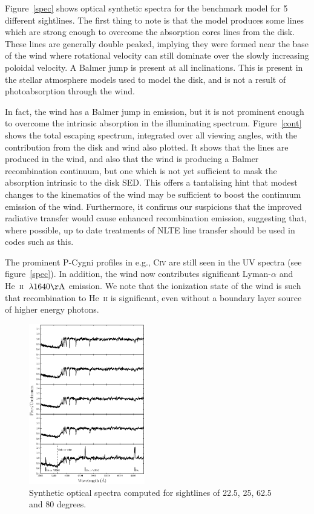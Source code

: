 \documentclass[preprint, a4paper, 11pt]{aastex}
\begin{document}
Figure~\ref{spec} shows optical synthetic spectra for the benchmark 
model for 5 different sightlines. The first thing to note is that the 
model produces some lines which are strong enough to overcome
the absorption cores lines from the disk. These lines are generally double peaked, 
implying they were formed near the base of the wind where rotational velocity
can still dominate over the slowly increasing poloidal velocity. A Balmer 
jump is present at all inclinations. This is present
in the stellar atmosphere models used to model the disk,
and is not a result of photoabsorption through the wind.

In fact, the wind has a Balmer jump in emission, but it is not prominent enough
to overcome the intrinsic absorption in the illuminating spectrum. 
Figure~\ref{cont} shows the total escaping spectrum, integrated
over all viewing angles, with the contribution from the disk and wind
also plotted. It shows that the lines are produced in the wind,
and also that the wind is producing a Balmer recombination
continuum, but one which is not yet sufficient to mask the absorption 
intrinsic to the disk SED. This offers a tantalising hint
that modest changes to the kinematics of the wind
may be sufficient to boost the continuum emission of the wind.
Furthermore, it confirms our suspicions that the improved
radiative transfer would cause enhanced recombination emission,
suggesting that, where possible, up to date treatments of
NLTE line transfer should be used in codes such as this.


The prominent P-Cygni profiles in e.g., C\textsc{iv} are still seen
in the UV spectra (see figure~\ref{spec}). In addition, the wind 
now contributes significant Lyman-$\alpha$ and
He~\textsc{ii}~$\lambda1640{\rm \AA}$  emission. 
We note that the ionization state of the wind 
is such that recombination to He~\textsc{ii} is significant, even
without a boundary layer source of higher energy photons.

\begin{figure} 
\includegraphics[width=0.45\textwidth]{figures/fig6_opt_cont.eps}
\caption{Synthetic optical spectra computed for sightlines of 22.5, 25, 62.5 and 80 degrees.}
\label{spec_continuum}
\end{figure} 
\end{document}
